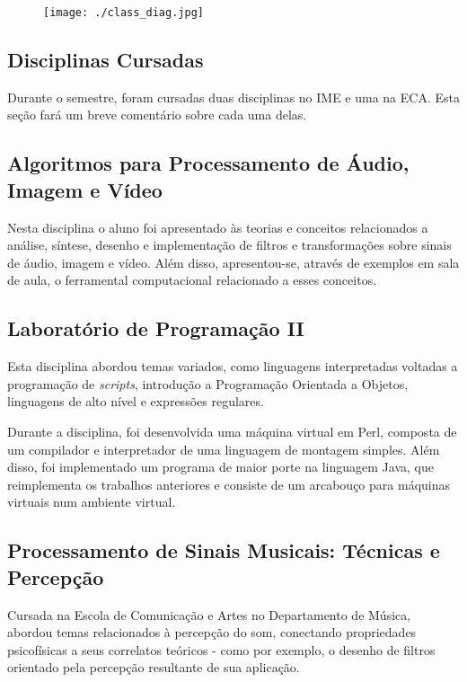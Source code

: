 \documentclass[a4paper, 11pt, twoside]{article}
\begin{document}
\begin{figure}[H]
  \centering
  \texttt{[image: ./class\_diag.jpg]}
  \label{fig2}
\end{figure}
\begin{multicols}{2}

\newpage
\section{Disciplinas Cursadas}

Durante o semestre, foram cursadas duas disciplinas no IME e uma na ECA.
Esta seção fará um breve comentário sobre cada uma delas.

\subsection{Algoritmos para Processamento de Áudio, Imagem e Vídeo}

Nesta disciplina o aluno foi apresentado às teorias e conceitos relacionados 
a análise, síntese, desenho e implementação de filtros e transformações sobre 
sinais de áudio, imagem e vídeo. Além disso, apresentou-se, através
de exemplos em sala de aula, o ferramental computacional relacionado a 
esses conceitos.

\subsection{Laboratório de Programação II}

Esta disciplina abordou temas variados, como linguagens interpretadas voltadas a
programação de \textit{scripts}, introdução a Programação Orientada 
a Objetos, linguagens de alto nível e expressões regulares.

Durante a disciplina, foi desenvolvida uma máquina virtual em Perl,
composta de um compilador e interpretador de uma
linguagem de montagem simples. Além disso, foi implementado um programa
de maior porte na linguagem Java, que reimplementa os trabalhos anteriores
e consiste de um arcabouço para máquinas virtuais num ambiente virtual.

\subsection{Processamento de Sinais Musicais: Técnicas e Percepção}

Cursada na Escola de Comunicação e Artes no Departamento de Música, abordou 
temas relacionados à percepção do som, conectando propriedades psicofísicas 
a seus correlatos teóricos - como por exemplo, o desenho de filtros orientado
pela percepção resultante de sua aplicação.


\end{multicols}
\end{document}
